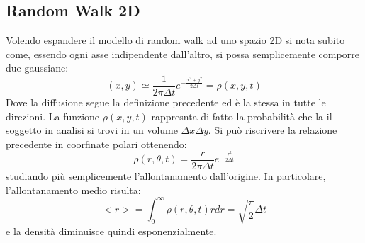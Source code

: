 \documentclass[12pt, a4paper]{book}
\theoremstyle{theorem}
\begin{document}
			\subsection{Random Walk 2D}
				Volendo espandere il modello di random walk ad uno spazio 2D si nota subito come, essendo ogni asse indipendente dall'altro, si possa semplicemente comporre due gaussiane:\\
				\begin{equation*}
					(x,y)\simeq\frac{1}{2\pi\Delta t}e^{-\frac{x^2+y^2}{2\Delta t}}=\rho(x,y,t)
				\end{equation*}
				Dove la diffusione segue la definizione precedente ed è la stessa in tutte le direzioni.
				La funzione $\rho(x,y,t)$ rappresnta di fatto la probabilità che la il soggetto in analisi si trovi in un volume $\Delta x\Delta y$.
				Si può riscrivere la relazione precedente in coorfinate polari ottenendo:
				\begin{equation*}
					\rho(r,\theta,t)=\frac{r}{2\pi\Delta t}e^{-\frac{r^2}{2\Delta t}}
				\end{equation*}
				studiando più semplicemente l'allontanamento dall'origine.
				In particolare, l'allontanamento medio risulta:
				\begin{equation*}
					<r>=\int_0^\infty\rho(r,\theta,t)rdr=\sqrt{\frac{\pi}{2}\Delta t}
				\end{equation*}
				e la densità diminuisce quindi esponenzialmente.
\end{document}
